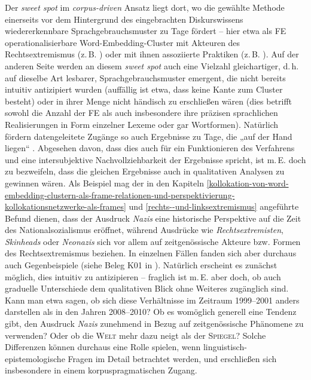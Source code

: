 Der \emph{sweet spot} im \emph{corpus-driven} Ansatz liegt dort, wo die gewählte Methode einerseits vor dem Hintergrund des eingebrachten Diskurswissens wiedererkennbare Sprachgebrauchsmuster zu Tage fördert -- hier etwa als FE operationalisierbare Word-Embedding-Cluster mit Akteuren des Rechtsextremismus (z.\,B. ) oder mit ihnen assoziierte Praktiken (z.\,B. ). Auf der anderen Seite werden an diesem \emph{sweet spot} auch eine Vielzahl gleichartiger, d.\,h. auf dieselbe Art lesbarer, Sprachgebrauchsmuster emergent, die nicht bereits intuitiv antizipiert wurden (auffällig ist etwa, dass keine Kante zum Cluster  besteht) oder in ihrer Menge nicht händisch zu erschließen wären (dies betrifft sowohl die Anzahl der FE als auch insbesondere ihre präzisen sprachlichen Realisierungen in Form einzelner Lexeme oder gar Wortformen). Natürlich fördern datengeleitete Zugänge so auch Ergebnisse zu Tage, die „auf der Hand liegen`` \autocite[430]{roemerBackRootsVerteidigungsrede2022}. Abgesehen davon, dass dies auch für ein Funktionieren des Verfahrens und eine intersubjektive Nachvollziehbarkeit der Ergebnisse spricht, ist m.\,E. doch zu bezweifeln, dass die gleichen Ergebnisse auch in qualitativen Analysen zu gewinnen wären. Als Beispiel mag der in den Kapiteln \ref{kollokation-von-word-embedding-clustern-als-frame-relationen-und-perspektivierung-kollokationsnetzwerke-als-frames} und \ref{rechts--und-linksextremismus} angeführte Befund dienen, dass der Ausdruck \emph{Nazis} eine historische Perspektive auf die Zeit des Nationalsozialismus eröffnet, während Ausdrücke wie \emph{Rechtsextremisten}, \emph{Skinheads} oder \emph{Neonazis} sich vor allem auf zeitgenössische Akteure bzw. Formen des Rechtsextremismus beziehen. In einzelnen Fällen fanden sich aber durchaus auch Gegenbeispiele (siehe Beleg K01 in ). Natürlich erscheint es zunächst möglich, dies intuitiv zu antizipieren -- fraglich ist m.\,E. aber doch, ob auch graduelle Unterschiede dem qualitativen Blick ohne Weiteres zugänglich sind. Kann man etwa sagen, ob sich diese Verhältnisse im Zeitraum 1999--2001 anders darstellen als in den Jahren 2008--2010? Ob es womöglich generell eine Tendenz gibt, den Ausdruck \emph{Nazis} zunehmend in Bezug auf zeitgenössische Phänomene zu verwenden? Oder ob die \textsc{Welt} mehr dazu neigt als der \textsc{Spiegel}? Solche Differenzen können durchaus eine Rolle spielen, wenn linguistisch-epistemologische Fragen im Detail betrachtet werden, und erschließen sich insbesondere in einem korpuspragmatischen Zugang.

